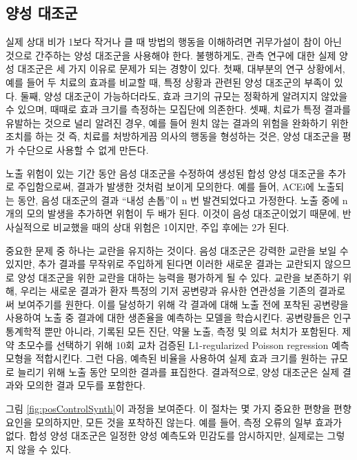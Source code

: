 \documentclass[11pt]{book}
\theoremstyle{definition}
\theoremstyle{definition}
\theoremstyle{definition}
\theoremstyle{remark}
\begin{document}
\subsection{양성 대조군}\label{PositiveControls}


실제 상대 비가 1보다 작거나 클 때 방법의 행동을 이해하려면 귀무가설이
참이 아닌 것으로 간주하는 양성 대조군을 사용해야 한다. 불행하게도, 관측
연구에 대한 실제 양성 대조군은 세 가지 이유로 문제가 되는 경향이 있다.
첫째, 대부분의 연구 상황에서, 예를 들어 두 치료의 효과를 비교할 때, 특정
상황과 관련된 양성 대조군의 부족이 있다. 둘째, 양성 대조군이
가능하더라도, 효과 크기의 규모는 정확하게 알려지지 않았을 수 있으며,
때때로 효과 크기를 측정하는 모집단에 의존한다. 셋째, 치료가 특정 결과를
유발하는 것으로 널리 알려진 경우, 예를 들어 원치 않는 결과의 위험을
완화하기 위한 조치를 하는 것 즉, 치료를 처방하게끔 의사의 행동을
형성하는 것은, 양성 대조군을 평가 수단으로 사용할 수 없게 만든다.
\citep{noren_2014}


노출 위험이 있는 기간 동안 음성 대조군을 수정하여 생성된 합성 양성
대조군을 추가로 주입함으로써, \citep{schuemie_2018} 결과가 발생한 것처럼
보이게 모의한다. 예를 들어, ACEi에 노출되는 동안, 음성 대조군의 결과
``내성 손톱''이 n 번 발견되었다고 가정한다. 노출 중에 n 개의 모의 발생을
추가하면 위험이 두 배가 된다. 이것이 음성 대조군이었기 때문에, 반
사실적으로 비교했을 때의 상대 위험은 1이지만, 주입 후에는 2가 된다.

중요한 문제 중 하나는 교란을 유지하는 것이다. 음성 대조군은 강력한
교란을 보일 수 있지만, 추가 결과를 무작위로 주입하게 된다면 이러한
새로운 결과는 교란되지 않으므로 양성 대조군을 위한 교란을 대하는 능력을
평가하게 될 수 있다. 교란을 보존하기 위해, 우리는 새로운 결과가 환자
특정의 기저 공변량과 유사한 연관성을 기존의 결과로써 보여주기를 원한다.
이를 달성하기 위해 각 결과에 대해 노출 전에 포착된 공변량을 사용하여
노출 중 결과에 대한 생존율을 예측하는 모델을 학습시킨다. 공변량들은 인구
통계학적 뿐만 아니라, 기록된 모든 진단, 약물 노출, 측정 및 의료 처치가
포함된다. 제약 초모수를 선택하기 위해 10회 교차 검증된 L1-regularized
Poisson regression \citep{suchard_2013} 예측 모형을 적합시킨다. 그런
다음, 예측된 비율을 사용하여 실제 효과 크기를 원하는 규모로 늘리기 위해
노출 동안 모의한 결과를 표집한다. 결과적으로, 양성 대조군은 실제 결과와
모의한 결과 모두를 포함한다.

그림 \ref{fig:posControlSynth}이 과정을 보여준다. 이 절차는 몇 가지
중요한 편향을 편향 요인을 모의하지만, 모든 것을 포착하진 않는다. 예를
들어, 측정 오류의 일부 효과가 없다. 합성 양성 대조군은 일정한 양성
예측도와 민감도를 암시하지만, 실제로는 그렇지 않을 수 있다.
\end{document}
